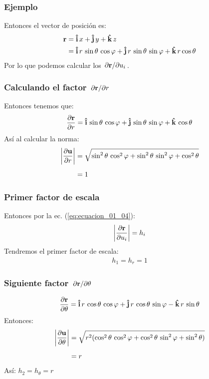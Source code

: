 \documentclass[12pt]{beamer}
\begin{document}
\begin{frame}
\frametitle{Ejemplo}
Entonces el vector de posición es:
\pause
\begin{align}
\begin{aligned}
\vb{r} &= \vu{i} \, x + \vu{j} \, y + \vu{k} \, z \\
&= \vu{i} \, r \, \sin \theta \, \cos \varphi + \vu{j} \, r \, \sin \theta \, \sin \varphi + \vu{k} \, r \cos \theta 
\end{aligned}
\label{eq:ecuacion_01_06}
\end{align}
\pause
Por lo que podemos calcular los $\pdv*{\vb{r}}{u_{i}}$.
\end{frame}
\begin{frame}
\frametitle{Calculando el factor $\pdv*{\vb{r}}{r}$}
Entonces tenemos que:
\pause
\begin{align*}
\pdv{\vb{r}}{r} = \vu{i} \, \sin \theta \, \cos \varphi + \vu{j} \, \sin \theta \, \sin \varphi + \vu{k} \, \cos \theta
\end{align*}
Así al calcular la norma:
\pause
\begin{align*}
\abs{\pdv{\vb{u}}{r}} &= \sqrt{\sin^{2} \theta \, \cos^{2} \varphi + \sin^{2} \theta \, \sin^{2} \varphi + \cos^{2} \theta} \\[0.5em]
&= 1
\end{align*}
\end{frame}
\begin{frame}
\frametitle{Primer factor de escala}
Entonces por la ec. (\ref{eq:ecuacion_01_04}):
\pause
\begin{align*}
\abs{\pdv{\vb{r}}{u_{i}}} = h_{i}
\end{align*}
Tendremos el primer factor de escala:
\pause
\begin{align*}
h_{1} = h_{r} = 1
\end{align*}
\end{frame}
\begin{frame}
\frametitle{Siguiente factor $\pdv*{\vb{r}}{\theta}$}
\begin{align*}
\pdv{\vb{r}}{\theta} = \vu{i} \, r \, \cos \theta \, \cos \varphi + \vu{j} \, r \, \cos \theta \, \sin \varphi - \vu{k} \, r \, \sin \theta
\end{align*}
\pause
Entonces:
\begin{align*}
\abs{\pdv{\vb{u}}{\theta}} &= \sqrt{r^{2} (\cos^{2} \theta \, \cos^{2} \varphi + \cos^{2} \theta \, \sin^{2} \varphi + \sin^{2} \theta)} \\[0.5em]
&= r
\end{align*}
\pause
Así: $h_{2} = h_{\theta} = r$
\end{frame}
\end{document}
